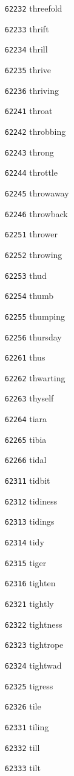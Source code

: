 \documentclass[twoside,11pt]{article}
\begin{document}
\begin{multicols}{5}
\begin{enumerate}
\item[\texttt{62232}] threefold
\item[\texttt{62233}] thrift
\item[\texttt{62234}] thrill
\item[\texttt{62235}] thrive
\item[\texttt{62236}] thriving
\item[\texttt{62241}] throat
\item[\texttt{62242}] throbbing
\item[\texttt{62243}] throng
\item[\texttt{62244}] throttle
\item[\texttt{62245}] throwaway
\item[\texttt{62246}] throwback
\item[\texttt{62251}] thrower
\item[\texttt{62252}] throwing
\item[\texttt{62253}] thud
\item[\texttt{62254}] thumb
\item[\texttt{62255}] thumping
\item[\texttt{62256}] thursday
\item[\texttt{62261}] thus
\item[\texttt{62262}] thwarting
\item[\texttt{62263}] thyself
\item[\texttt{62264}] tiara
\item[\texttt{62265}] tibia
\item[\texttt{62266}] tidal
\item[\texttt{62311}] tidbit
\item[\texttt{62312}] tidiness
\item[\texttt{62313}] tidings
\item[\texttt{62314}] tidy
\item[\texttt{62315}] tiger
\item[\texttt{62316}] tighten
\item[\texttt{62321}] tightly
\item[\texttt{62322}] tightness
\item[\texttt{62323}] tightrope
\item[\texttt{62324}] tightwad
\item[\texttt{62325}] tigress
\item[\texttt{62326}] tile
\item[\texttt{62331}] tiling
\item[\texttt{62332}] till
\item[\texttt{62333}] tilt

\end{enumerate}
\end{multicols}
\end{document}

